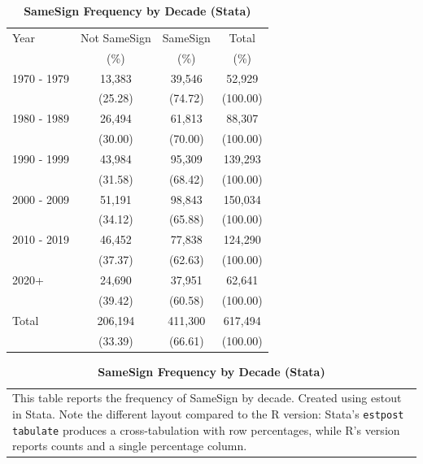 \documentclass[english,12pt]{article}
\begin{document}
\clearpage\newpage


\begin{table}[htbp]\centering\footnotesize{
\renewcommand{\arraystretch}{1.5}
\caption{\textbf{SameSign Frequency by Decade (Stata)} \label{tab:freq-stata}}
\def\sym#1{\ifmmode^{#1}\else\(^{#1}\)\fi}

\begin{tabularx}{\textwidth}{Xccc}
\toprule
Year & Not SameSign & SameSign & Total\\
     & (\%) & (\%) & (\%) \\
\midrule
1970 - 1979&   13,383&   39,546&   52,929\\
          &  (25.28)&  (74.72)& (100.00)\\
1980 - 1989&   26,494&   61,813&   88,307\\
          &  (30.00)&  (70.00)& (100.00)\\
1990 - 1999&   43,984&   95,309&  139,293\\
          &  (31.58)&  (68.42)& (100.00)\\
2000 - 2009&   51,191&   98,843&  150,034\\
          &  (34.12)&  (65.88)& (100.00)\\
2010 - 2019&   46,452&   77,838&  124,290\\
          &  (37.37)&  (62.63)& (100.00)\\
2020+     &   24,690&   37,951&   62,641\\
          &  (39.42)&  (60.58)& (100.00)\\
Total     &  206,194&  411,300&  617,494\\
          &  (33.39)&  (66.61)& (100.00)\\
\bottomrule
\end{tabularx}

\vspace{-1.5\baselineskip}
\singlespace
\flushleft
\begin{tabular}{@{}p{\linewidth}@{}}
\footnotesize
This table reports the frequency of SameSign by decade. Created using estout in Stata. Note the different layout compared to the R version: Stata's \texttt{estpost tabulate} produces a cross-tabulation with row percentages, while R's version reports counts and a single percentage column.
\end{tabular}
}
\end{table}
\end{document}
